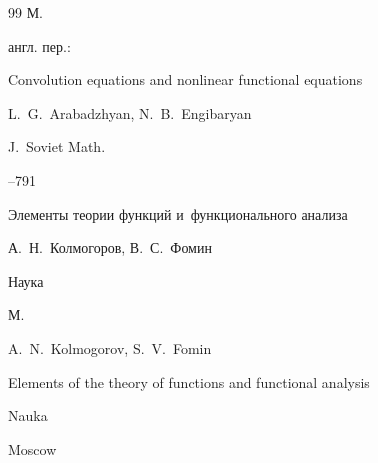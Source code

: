\begin{thebibliography}{99}
\publaddr М.




\transl англ. пер.:~

\paper Convolution equations and nonlinear functional equations

\by  L.~G.~Arabadzhyan, N.~B.~Engibaryan

\jour J.~Soviet Math.




--791





\book Элементы теории функций и~функционального анализа

\by  А.~Н.~Колмогоров, В.~С.~Фомин

\publ Наука

\publaddr М.



\misctransl

\by A.~N.~Kolmogorov, S.~V.~Fomin

\book Elements of the theory of functions and functional analysis

\publ Nauka

\publaddr Moscow





\end{thebibliography}



\noindent

\hskip6.5cm \thedate \par\noindent

\hskip6.5cm\therevdate

%

%

%






\makeengtitlem



\newpage



%

